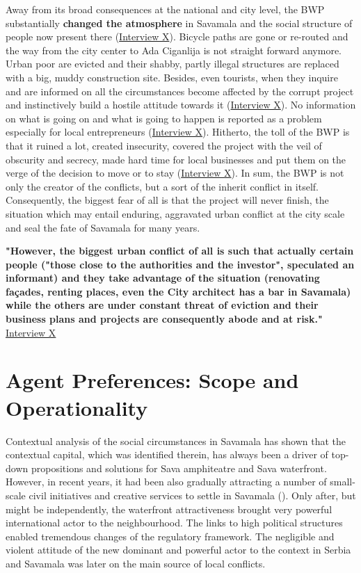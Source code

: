 \documentclass[11pt]{report}
\begin{document}
Away from its broad consequences at the national and city level, the BWP substantially \textbf{changed the atmosphere} in Savamala and the social structure of people now present there
(\href{InterviewX}{Interview X}).
Bicycle paths are gone or re-routed and the way from the city center to Ada Ciganlija is not straight forward anymore.
Urban poor are evicted and their shabby, partly illegal structures are replaced with a big, muddy construction site.
Besides, even tourists, when they inquire and are informed on all the circumstances become affected by the corrupt project and instinctively build a hostile attitude towards it
(\href{InterviewX}{Interview X}).
No information on what is going on and what is going to happen is reported as a problem especially for local entrepreneurs
(\href{InterviewX}{Interview X}).
Hitherto, the toll of the BWP is that it ruined a lot, created insecurity, covered the project with the veil of obscurity and secrecy, made hard time for local businesses and put them on the verge of the decision to move or to stay
(\href{InterviewX}{Interview X}).
In sum, the BWP is not only the creator of the conflicts, but a sort of the inherit conflict in itself.
Consequently, the biggest fear of all is that the project will never finish, the situation which may entail enduring, aggravated urban conflict at the city scale and seal the fate of Savamala for many years.

\textbf{"However, the biggest urban conflict of all is such that actually certain people ("those close to the authorities and the investor", speculated an informant)  and they take advantage of the situation (renovating façades, renting places, even the City architect has a bar in Savamala) while the others are under constant threat of eviction and their business plans and projects are consequently abode and at risk."} \href{InterviewX}{Interview X}

\section{Agent Preferences: Scope and Operationality}

Contextual analysis of the social circumstances in Savamala has shown that the contextual capital, which was identified therein, has always been a driver of top-down propositions and solutions for Sava amphiteatre and Sava waterfront.
However, in recent years, it had been also  gradually attracting a number of small-scale civil initiatives and creative services to settle in Savamala (\href{ref}{\citealt{cvetinovic_engine_2013}}).
Only after, but might be independently, the waterfront attractiveness brought very powerful international actor to the neighbourhood.
The links to high political structures enabled tremendous changes of the regulatory framework.
The negligible and violent attitude of the new dominant and powerful actor to the context in Serbia and Savamala was later on the main source of local conflicts. 
\\
\end{document}
